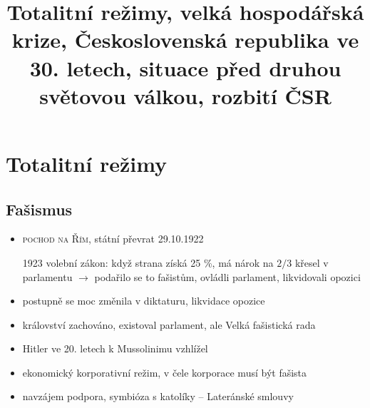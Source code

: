 \documentclass{article}
\title{\vspace{-2cm}Totalitní režimy, velká hospodářská krize, Československá republika ve 30. letech, situace před druhou světovou válkou, rozbití ČSR\vspace{-1.7cm}}
\date{}
\author{}
\begin{document}
\maketitle

\section*{Totalitní režimy}
\subsection*{Fašismus}
\begin{itemize}
    \item \textsc{pochod na Řím}, státní převrat 29.10.1922
    \item[1923] volební zákon: když strana získá 25 \%, má nárok na $2/3$ křesel v parlamentu $\rightarrow$ podařilo se to fašistům, ovládli parlament, likvidovali opozici
    \item postupně se moc změnila v diktaturu, likvidace opozice
    \item království zachováno, existoval parlament, ale Velká fašistická rada
    \item Hitler ve 20. letech k Mussolinimu vzhlížel
    \item ekonomický korporativní režim, v čele korporace musí být fašista
    \item navzájem podpora, symbióza s katolíky -- Lateránské smlouvy
\end{itemize}
\end{document}
